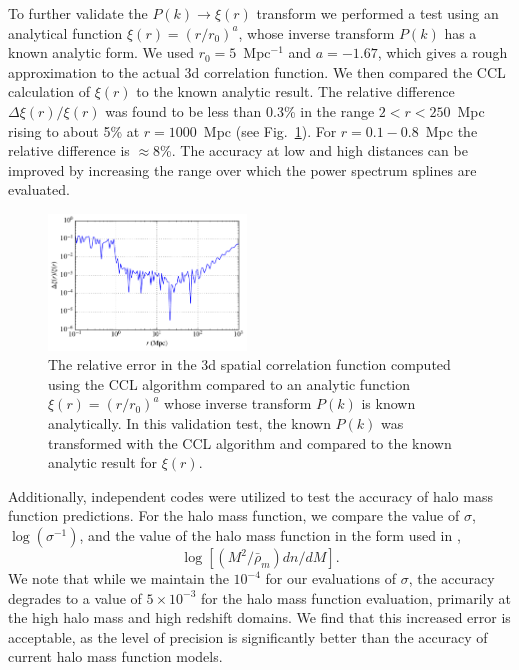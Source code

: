 \documentclass[\docopts]{\docclass}
\begin{document}
%
To further validate the $P(k) \to \xi(r)$ transform we performed a test using an analytical function $\xi(r) = (r / r_0)^a$, whose inverse transform $P(k)$ 
has a known analytic form. We used $r_0 = 5$~Mpc$^{-1}$ and $a = -1.67$, which gives a rough approximation to the actual 3d correlation function.   
We then compared the CCL calculation of $\xi(r)$ to the known analytic result. The relative difference $\Delta \xi(r) / \xi(r)$ was found to be   
less than 0.3\% in the range $2 < r < 250$~Mpc rising to about 5\% at $r = 1000$~Mpc (see Fig.~\ref{fig:analytic_xi}). For $r=0.1-0.8$~Mpc the relative difference is $\approx$8\%. The accuracy at low and high distances can be improved by increasing the range over which the power spectrum splines are evaluated.
%
\begin{figure}[htbp]
\centering
\includegraphics[width=0.47\textwidth]{analytic_xi}
\caption{The relative error in the 3d spatial correlation function computed using the CCL algorithm compared to an analytic function $\xi(r) = (r/r_0)^a$ whose inverse transform $P(k)$ is known analytically. In this validation test, the known $P(k)$ was transformed with the CCL algorithm and compared to the known analytic result for $\xi(r)$.}
\label{fig:analytic_xi}
\end{figure}


Additionally, independent codes were utilized to test the accuracy of halo mass function predictions. For the halo mass function, we compare the value of $\sigma$, $\log(\sigma^{-1})$, and the value of the halo mass function in the form used in \cite{Tinker2008},
\begin{equation}
\log[(M^2/\bar{\rho}_m)dn/dM].
\end{equation}
We note that while we maintain the $10^{-4}$ for our evaluations of $\sigma$, the accuracy degrades to a value of $5\times10^{-3}$ for the halo mass function evaluation, primarily at the high halo mass and high redshift domains. We find that this increased error is acceptable, as the level of precision is significantly better than the accuracy of current halo mass function models.
\end{document}
